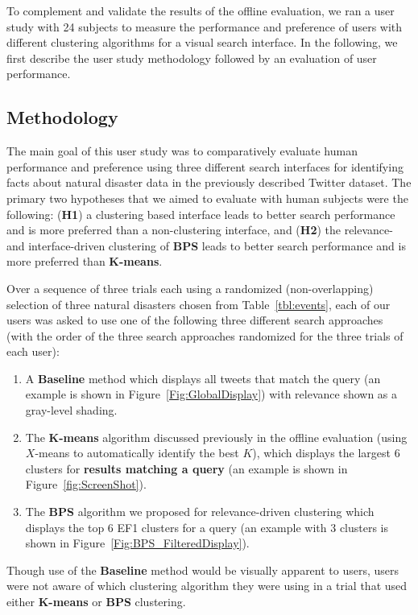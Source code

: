To complement and validate the results of the offline evaluation, we ran a user study with 24 subjects to measure the performance and preference of users with different clustering algorithms for a visual search interface.  In the following, we first describe the user study methodology followed by an evaluation of user performance.

\subsection{Methodology}
The main goal of this user study was to comparatively evaluate human performance and preference using three different search interfaces for identifying facts about natural disaster data in the previously described Twitter dataset.  The primary two hypotheses that we aimed to evaluate with human subjects were the following: ({\bf H1}) a clustering based interface leads to better search performance and is more preferred than a non-clustering interface, and ({\bf H2}) the relevance- and interface-driven clustering of {\bf BPS} leads to better search performance and is more preferred than {\bf $\mathbf{K}$-means}.

Over a sequence of three trials each using a randomized (non-overlapping) selection of three natural disasters chosen from Table~\ref{tbl:events}, each of our users was asked to use one of the following three different search approaches (with the order of the three search approaches randomized for the three trials of each user):
\begin{enumerate}[leftmargin=*]
\item A {\bf Baseline} method which displays all tweets that match the query (an example is shown in  Figure~\ref{Fig:GlobalDisplay}) with relevance shown as a gray-level shading.
\item The {\bf $\mathbf{K}$-means} algorithm discussed previously in the offline evaluation (using $X$-means to automatically identify the best $K$), which displays the largest 6  clusters for {\bf results matching a query} (an example is shown in Figure~\ref{fig:ScreenShot}).
\item The {\bf BPS} algorithm we proposed for relevance-driven clustering which displays the top 6 EF1 clusters for a query (an example with 3 clusters is shown in Figure~\ref{Fig:BPS_FilteredDisplay}).
\end{enumerate}
Though use of the {\bf Baseline} method would be visually apparent to users, users were not aware of which clustering algorithm they were using in a trial that used either {\bf $\mathbf{K}$-means} or {\bf BPS} clustering.

